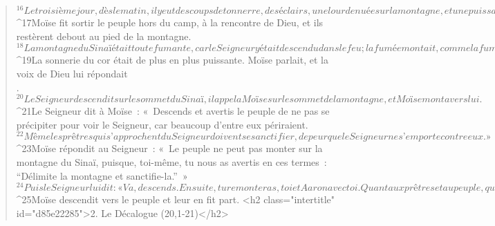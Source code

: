 \begin{verse}
${}^{16}Le troisième jour, dès le matin, il y eut des coups de tonnerre, des éclairs, une lourde nuée sur la montagne, et une puissante sonnerie de cor ; dans le camp, tout le peuple trembla. 
${}^{17}Moïse fit sortir le peuple hors du camp, à la rencontre de Dieu, et ils restèrent debout au pied de la montagne. 
${}^{18}La montagne du Sinaï était toute fumante, car le Seigneur y était descendu dans le feu ; la fumée montait, comme la fumée d’une fournaise, et toute la montagne tremblait violemment. 
${}^{19}La sonnerie du cor était de plus en plus puissante. Moïse parlait, et la voix de Dieu lui répondait\\. 
${}^{20}Le Seigneur descendit sur le sommet du Sinaï, il appela Moïse sur le sommet de la montagne, et Moïse monta vers lui. 
${}^{21}Le Seigneur dit à Moïse : « Descends et avertis le peuple de ne pas se précipiter pour voir le Seigneur, car beaucoup d’entre eux périraient. 
${}^{22}Même les prêtres qui s’approchent du Seigneur doivent se sanctifier, de peur que le Seigneur ne s’emporte contre eux. » 
${}^{23}Moïse répondit au Seigneur : « Le peuple ne peut pas monter sur la montagne du Sinaï, puisque, toi-même, tu nous as avertis en ces termes : “Délimite la montagne et sanctifie-la.” » 
${}^{24}Puis le Seigneur lui dit : « Va, descends. Ensuite, tu remonteras, toi et Aaron avec toi. Quant aux prêtres et au peuple, qu’ils ne se précipitent pas pour monter vers le Seigneur, de peur que le Seigneur ne s’emporte contre eux. » 
${}^{25}Moïse descendit vers le peuple et leur en fit part.
      <h2 class="intertitle" id="d85e22285">2. Le Décalogue (20,1-21)</h2>
      

\end{verse}
